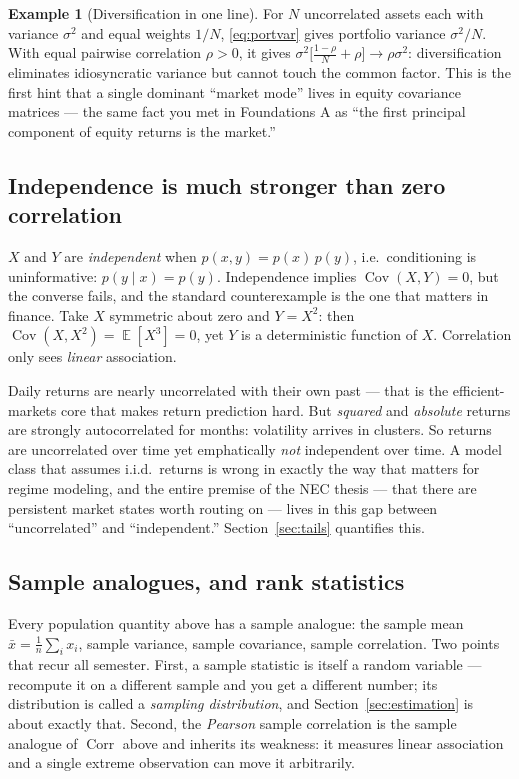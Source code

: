 \documentclass[11pt]{article}
\numberwithin{equation}{section}
\theoremstyle{plain}
\theoremstyle{definition}
\newtheorem{example}[theorem]{Example}
\theoremstyle{remark}
\DeclareMathOperator{\E}{\mathbb{E}}
\DeclareMathOperator{\Cov}{Cov}
\DeclareMathOperator{\Corr}{Corr}
\begin{document}
\begin{example}[Diversification in one line]
For $N$ uncorrelated assets each with variance $\sigma^2$ and equal weights $1/N$, \eqref{eq:portvar} gives portfolio variance $\sigma^2/N$. With equal pairwise correlation $\rho > 0$, it gives $\sigma^2\big[\tfrac{1-\rho}{N} + \rho\big] \to \rho\sigma^2$: diversification eliminates idiosyncratic variance but cannot touch the common factor. This is the first hint that a single dominant ``market mode'' lives in equity covariance matrices --- the same fact you met in Foundations A as ``the first principal component of equity returns is the market.''
\end{example}

\subsection{Independence is much stronger than zero correlation}

$X$ and $Y$ are \emph{independent} when $p(x,y) = p(x)\,p(y)$, i.e.\ conditioning is uninformative: $p(y \mid x) = p(y)$. Independence implies $\Cov(X,Y) = 0$, but the converse fails, and the standard counterexample is the one that matters in finance. Take $X$ symmetric about zero and $Y = X^2$: then $\Cov(X, X^2) = \E[X^3] = 0$, yet $Y$ is a deterministic function of $X$. Correlation only sees \emph{linear} association.

\begin{finbox}
Daily returns are nearly uncorrelated with their own past --- that is the efficient-markets core that makes return prediction hard. But \emph{squared} and \emph{absolute} returns are strongly autocorrelated for months: volatility arrives in clusters. So returns are uncorrelated over time yet emphatically \emph{not} independent over time. A model class that assumes i.i.d.\ returns is wrong in exactly the way that matters for regime modeling, and the entire premise of the NEC thesis --- that there are persistent market states worth routing on --- lives in this gap between ``uncorrelated'' and ``independent.'' Section~\ref{sec:tails} quantifies this.
\end{finbox}

\subsection{Sample analogues, and rank statistics}

Every population quantity above has a sample analogue: the sample mean $\bar{x} = \tfrac1n \sum_i x_i$, sample variance, sample covariance, sample correlation. Two points that recur all semester. First, a sample statistic is itself a random variable --- recompute it on a different sample and you get a different number; its distribution is called a \emph{sampling distribution}, and Section~\ref{sec:estimation} is about exactly that. Second, the \emph{Pearson} sample correlation is the sample analogue of $\Corr$ above and inherits its weakness: it measures linear association and a single extreme observation can move it arbitrarily.
\end{document}
